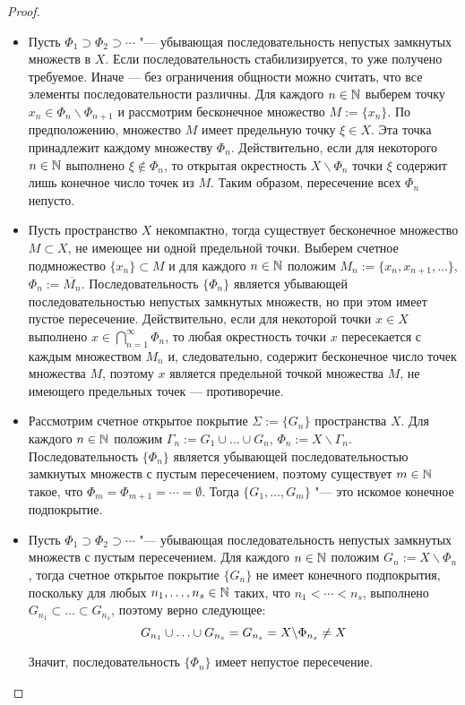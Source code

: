 \begin{proof}~
    \begin{itemize}
        \item{}Пусть $\Phi_1 \supset \Phi_2 \supset \dotsb$ "--- убывающая последовательность непустых замкнутых множеств в $X$. Если последовательность стабилизируется, то уже получено требуемое. Иначе --- без ограничения общности можно считать, что все элементы последовательности различны. Для каждого $n \in \mathbb{N}$ выберем точку $x_n\in\Phi_n\backslash \Phi_{n+1}$ и рассмотрим бесконечное множество $M := \lbrace x_n\rbrace$. По предположению, множество $M$ имеет предельную точку $\xi \in X$. Эта точка принадлежит каждому множеству $\Phi_n$. Действительно, если для некоторого $n \in \mathbb{N}$ выполнено $\xi \not\in \Phi_n$, то открытая окрестность $X \backslash \Phi_n$ точки $\xi$ содержит лишь конечное число точек из $M$. Таким образом, пересечение всех $\Phi_n$ непусто.
        
        \item{}Пусть пространство $X$ некомпактно, тогда существует бесконечное множество $M\subset X$, не имеющее ни одной предельной точки. Выберем счетное подмножество $\{x_n\}\subset M$ и для каждого $n \in \mathbb{N}$ положим $M_n := \lbrace x_n, x_{n+1}, \dotsc\}$, $\Phi_n := \overline{M_n}$. Последовательность $\{\Phi_n\}$ является убывающей последовательностью непустых замкнутых множеств, но при этом имеет пустое пересечение. Действительно, если для некоторой точки $x \in X$ выполнено $x \in \bigcap_{n = 1}^{\infty} \Phi_n$, то любая окрестность точки $x$ пересекается с каждым множеством $M_n$ и, следовательно, содержит бесконечное число точек множества $M$, поэтому $x$ является предельной точкой множества $M$, не имеющего предельных точек --- противоречие.

        \item{}Рассмотрим счетное открытое покрытие $\Sigma := \{G_n\}$ пространства $X$. Для каждого $n \in \mathbb{N}$ положим $\Gamma_n := G_1\cup \ldots \cup G_n$, $\Phi_n := X\backslash \Gamma_n$. Последовательность $\{\Phi_n\}$ является убывающей последовательностью замкнутых множеств с пустым пересечением, поэтому существует $m \in \mathbb{N}$ такое, что $\Phi_m = \Phi_{m+1} = \dotsb = \emptyset$. Тогда $\lbrace G_1,\ldots, G_m\rbrace$ "--- это искомое конечное подпокрытие.

        \item{}Пусть $\Phi_1 \supset \Phi_2 \supset \dotsb$ "--- убывающая последовательность непустых замкнутых множеств с пустым пересечением. Для каждого $n \in \mathbb{N}$ положим $G_n := X \backslash \Phi_n$, тогда счетное открытое покрытие $\{G_n\}$ не имеет конечного подпокрытия, поскольку для любых $n_1, \dotsc, n_s \in \mathbb{N}$ таких, что $n_1 < \dotsb < n_s$, выполнено $ G_{n_1}\subset\ldots\subset G_{n_s}$, поэтому верно следующее:
        \[G_{n_1}\cup\ldots\cup G_{n_s} =  G_{n_s} = X \backslash \Phi_{n_s} \ne X\]

        Значит, последовательность $\{\Phi_n\}$ имеет непустое пересечение.\qedhere
    \end{itemize}
\end{proof}


